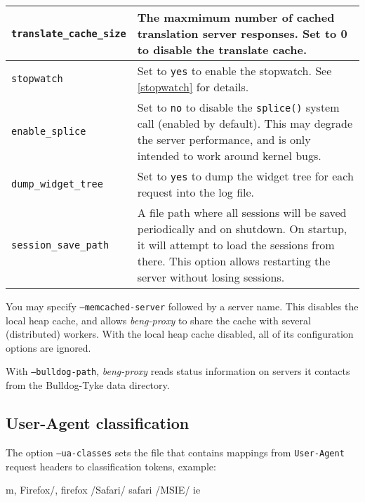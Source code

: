 \documentclass[a4paper,12pt]{article}
\begin{document}
\begin{longtable}{|l|p{8cm}|}
\hline

\verb|translate_cache_size| & The maxmimum number of cached
translation server responses.  Set to 0 to disable the translate
cache. \\

\hline

\verb|stopwatch| & Set to \texttt{yes} to enable the stopwatch.  See
\ref{stopwatch} for details. \\

\hline

\verb|enable_splice| & Set to \texttt{no} to disable the
\texttt{splice()} system call (enabled by default).  This may degrade
the server performance, and is only intended to work around kernel
bugs. \\

\hline

\verb|dump_widget_tree| & Set to \texttt{yes} to dump the widget
tree for each request into the log file. \\

\hline

\verb|session_save_path| & A file path where all sessions will be
saved periodically and on shutdown.  On startup, it will attempt to
load the sessions from there.  This option allows restarting the
server without losing sessions.  \\

\hline
\end{longtable}

\label{memcached}
You may specify \texttt{--memcached-server} followed by a server name.
This disables the local heap cache, and allows \emph{beng-proxy} to
share the cache with several (distributed) workers.  With the local
heap cache disabled, all of its configuration options are ignored.

\label{bulldog}
With \texttt{--bulldog-path}, \emph{beng-proxy} reads status
information on servers it contacts from the Bulldog-Tyke data
directory.

\subsection{User-Agent classification}
\label{uaclass}

The option \texttt{--ua-classes} sets the file that contains mappings
from \texttt{User-Agent} request headers to classification tokens,
example:

\begin{verbatim*}
m, Firefox/, firefox
/Safari/ safari
/MSIE/ ie
\end{verbatim*}
\end{document}
